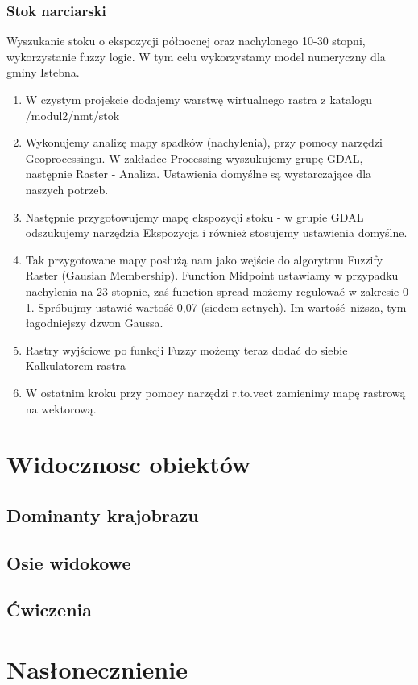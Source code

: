 \documentclass[a4paper,11pt, onecolumn, openany]{memoir}
\begin{document}
			\subsection{Stok narciarski}
	Wyszukanie stoku o ekspozycji północnej oraz nachylonego 10-30 stopni, wykorzystanie fuzzy logic. W tym celu wykorzystamy model numeryczny dla gminy Istebna.
	\begin{enumerate}
	\item W czystym projekcie dodajemy warstwę wirtualnego rastra z katalogu /modul2/nmt/stok
	\item Wykonujemy analizę mapy spadków (nachylenia), przy pomocy narzędzi Geoprocessingu. W zakładce Processing wyszukujemy grupę GDAL, następnie Raster - Analiza. Ustawienia domyślne są wystarczające dla naszych potrzeb.
	\item Następnie przygotowujemy mapę ekspozycji stoku - w grupie GDAL odszukujemy narzędzia Ekspozycja i również stosujemy ustawienia domyślne.
	\item Tak przygotowane mapy posłużą nam jako wejście do algorytmu Fuzzify Raster (Gausian Membership). Function Midpoint ustawiamy w przypadku nachylenia na 23 stopnie, zaś function spread możemy regulować w zakresie 0-1. Spróbujmy ustawić wartość 0,07 (siedem setnych). Im wartość niższa, tym łagodniejszy dzwon Gaussa.
	\item Rastry wyjściowe po funkcji Fuzzy możemy teraz dodać do siebie Kalkulatorem rastra
	\item W ostatnim kroku przy pomocy narzędzi r.to.vect zamienimy mapę rastrową na wektorową.
\end{enumerate}
	\chapter{Widocznosc obiektów}
\section{Dominanty krajobrazu}
\section{Osie widokowe}
\section{Ćwiczenia}

\chapter{Nasłonecznienie}
\end{document}
